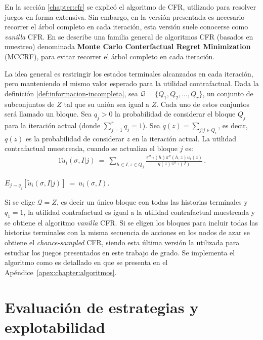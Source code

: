 En la sección \ref{chapter:cfr} se explicó el algoritmo de CFR, utilizado para resolver juegos en forma extensiva. Sin embargo, en la versión presentada es necesario recorrer el árbol completo en cada iteración, esta versión suele conocerse como \textit{vanilla} CFR. En \cite{bib:montecarlo-cfr} se describe una familia general de algoritmos CFR (basados en muestreo) denominada \textbf{Monte Carlo Conterfactual Regret Minimization} (MCCRF), para evitar recorrer el árbol completo en cada iteración.

La idea general es restringir los estados terminales alcanzados en cada iteración, pero manteniendo el mismo valor esperado para la utilidad contrafactual. Dada la definición \ref{def:informacion-incompleta}, sea $\mathcal{Q} = \{Q_1, Q_2, ..., Q_r\}$, un conjunto de subconjuntos de $Z$ tal que su unión sea igual a $Z$. Cada uno de estos conjuntos será llamado un bloque. Sea $q_j > 0$ la probabilidad de considerar el bloque $Q_j$ para la iteración actual (donde $\sum_{j = 1}^r {q_j} = 1$). 
Sea $q(z) = \sum_{j | j \in Q_i}$, es decir, $q(z)$ es la probabilidad de considerar $z$ en la iteración actual. La utilidad contrafactual muestreada, cuando se actualiza el bloque $j$ es:
\begin{alignat}{1}
\tilde{u}_i(\sigma, I | j)\ =\ \sum_{h \in I, z \in Q_j} \frac{\pi^{\sigma_{-i}}(h) \pi^{\sigma}(h, z) u_i(z)}{q(z) \pi^{\sigma_{-i}}(I)} \,.
\end{alignat}

\begin{theorem}
\label{theo:esperanza-MCCFR}
$E_{j \sim q_j} [\tilde{u}_i(\sigma, I | j)]\ =\ u_i(\sigma, I)$.
\end{theorem}

Si se elige $\mathcal{Q} = {Z}$, es decir un único bloque con todas las historias terminales y $q_1 = 1$, la utilidad contrafactual es igual a la utilidad contrafactual muestreada y se obtiene el algoritmo \textit{vanilla} CFR. Si se eligen los bloques para incluir todas las historias terminales con la misma secuencia de acciones en los nodos de azar se obtiene el \textit{chance-sampled} CFR, siendo esta última versión la utilizada para estudiar los juegos presentados en este trabajo de grado. Se implementa el algoritmo como es detallado en \cite{bib:introductionCFR} que se presenta en el Apéndice~\ref{apex:chapter:algoritmos}.

\section{Evaluación de estrategias y explotabilidad}

